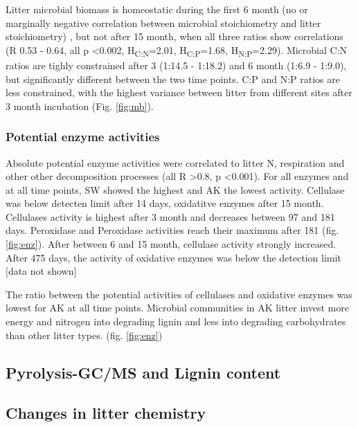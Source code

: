 \documentclass[authoryear,preprint,review,12pt]{elsarticle}
\begin{document}
Litter microbial biomass is homeostatic during the first 6 month (no or marginally negative correlation between microbial stoichiometry and litter stoichiometry) \citep{Mooshammer2011}, but not after 15 month, when all three ratios show correlations (R 0.53 - 0.64, all p \textless 0.002, H\textsubscript{C:N}=2.01, H\textsubscript{C:P}=1.68, H\textsubscript{N:P}=2.29). Microbial C:N ratios are tighly constrained after 3 (1:14.5 - 1:18.2) and 6 month (1:6.9 - 1:9.0), but significantly different between the two time points. C:P and N:P ratios are less constrained, with the highest variance between litter from different sites after 3 month incubation (Fig. \ref{fig:mb}).

\subsubsection{Potential enzyme activities}
Absolute potential enzyme activities were correlated to litter N, respiration and other other decomposition processes (all R \textgreater  0.8, p \textless 0.001). For all enzymes and at all time points, SW showed the highest and AK the lowest activity. Cellulase was below detecten limit after 14 days, oxidatitve enzymes after 15 month. Cellulases activity is highest after 3 month and decreases between 97 and 181 days. Peroxidase and Peroxidase activities reach their maximum after 181 (fig. \ref{fig:enz}). After between 6 and 15 month, cellulase activity strongly increased. After 475 days, the activity of oxidative enzymes was below the detection limit [data not shown]

The ratio between the potential activities of cellulases and oxidative enzymes was lowest for AK at all time points. Microbial communities in AK litter invest more energy and nitrogen into degrading lignin and less into degrading carbohydrates than other litter types. (fig. \ref{fig:enz})

\subsection{Pyrolysis-GC/MS and Lignin content}
\subsection{Changes in litter chemistry}
\end{document}
